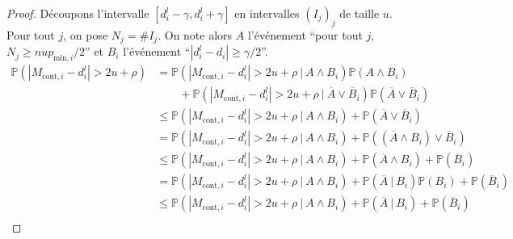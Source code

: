 \begin{proof}
    Découpons l'intervalle \([d_i^l - \gamma, d_i^l + \gamma]\) en intervalles \((I_j)_j\) de taille \(u\). Pour tout \(j\), on pose \(N_j = \#I_j\). On note alors \(A\) l'événement ``pour tout \(j\), \(N_j \geq nup_{\text{min}, i}/2\)'' et \(B_i\) l'événement ``\(|d_i^l - d_i| \geq \gamma/2\)''.\\
    \begin{align*}
        \mathbb P\left( |M_{\text{cont}, i} - d_i^l| > 2u + \rho \right) & = \mathbb P\left( |M_{\text{cont}, i} - d_i^l| > 2u + \rho \ | \ A \wedge B_i\right)\mathbb P\left( A \wedge B_i \right)\\
        & \quad \quad  + \mathbb P\left( |M_{\text{cont}, i} - d_i^l| > 2u + \rho \ | \ \overline A \vee \overline B_i\right) \mathbb P \left( \overline A \vee \overline B_i \right)\\
        & \leq \mathbb P\left( |M_{\text{cont}, i} - d_i^l| > 2u + \rho \ | \ A \wedge B_i\right) +   \mathbb P \left( \overline A \vee \overline B_i \right)\\
        & = \mathbb P\left( |M_{\text{cont}, i} - d_i^l| > 2u + \rho \ | \ A \wedge B_i\right) +   \mathbb P \left( (\overline A \wedge B_i) \vee \overline B_i \right)\\
        & \leq \mathbb P\left( |M_{\text{cont}, i} - d_i^l| > 2u + \rho \ | \ A \wedge B_i\right) +   \mathbb P \left( \overline A \wedge B_i\right) + \mathbb P \left( \overline B_i \right)\\
        & = \mathbb P\left( |M_{\text{cont}, i} - d_i^l| > 2u + \rho \ | \ A \wedge B_i\right) +   \mathbb P \left( \overline A \ |\ B_i\right)\mathbb P (B_i) + \mathbb P \left( \overline B_i \right)\\
        & \leq \mathbb P\left( |M_{\text{cont}, i} - d_i^l| > 2u + \rho \ | \ A \wedge B_i\right) +   \mathbb P \left( \overline A \ |\ B_i\right) + \mathbb P \left( \overline B_i \right)\\
    \end{align*}


\end{proof}
